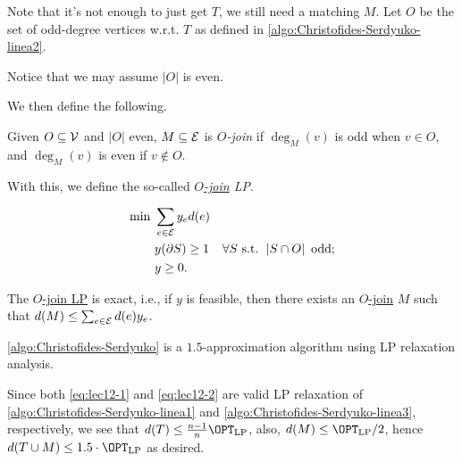 Note that it's not enough to just get \(T\), we still need a matching \(M\). Let \(O\) be the set of odd-degree vertices w.r.t. \(T\) as defined in \autoref{algo:Christofides-Serdyuko-linea2}.
\begin{note}
	Notice that we may assume \(\left\vert O \right\vert \) is even.
\end{note}

We then define the following.

\begin{definition}[\(O\)-join]\label{def:O-join}
	Given \(O\subseteq \mathcal{\MakeUppercase{v}} \) and \(\left\vert O \right\vert \) even, \(M \subseteq \mathcal{\MakeUppercase{e}} \) is \emph{\(O\)-join} if \(\deg_M(v)\) is odd when \(v\in O\), and \(\deg_M(v)\) is even if \(v \notin O\).
\end{definition}

With this, we define the so-called \emph{\hyperref[def:O-join]{\(O\)-join} LP}.

\begin{equation}\label{eq:lec12-2}
	\begin{aligned}
		\min~ & \sum_{e\in \mathcal{\MakeUppercase{e}} } y_e d(e)                                                                      \\
		      & y(\partial S) \geq 1                              & \forall S\text{ s.t. }\left\vert S \cap O \right\vert \text{ odd}; \\
		      & y\geq 0.
	\end{aligned}
\end{equation}

\begin{theorem}
	The \hyperref[eq:lec12-2]{\(O\)-join LP} is exact, i.e., if \(y\) is feasible, then there exists an \hyperref[def:O-join]{\(O\)-join} \(M\) such that \(d(M) \leq \sum_{e\in \mathcal{\MakeUppercase{e}} } d(e)y_e\).
\end{theorem}

\begin{remark}
	\autoref{algo:Christofides-Serdyuko} is a \(1.5\)-approximation algorithm using LP relaxation analysis.
\end{remark}
\begin{explanation}
	Since both \autoref{eq:lec12-1} and \autoref{eq:lec12-2} are valid LP relaxation of \autoref{algo:Christofides-Serdyuko-linea1} and \autoref{algo:Christofides-Serdyuko-linea3}, respectively, we see that \(d(T) \leq \frac{n-1}{n}\OPT_{\mathrm{LP}}\), also, \(d(M) \leq \OPT_{\mathrm{LP} } / 2\), hence \(d(T \cup M) \leq 1.5\cdot \OPT_{\mathrm{LP} }\) as desired.
\end{explanation}